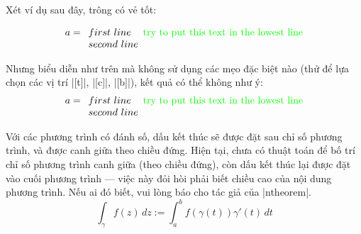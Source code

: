 {\begin{Theorem}
{\begin{Lemma}
\medskip
Xét ví dụ sau đây, trông có vẻ tốt:
\begin{command}
 \[\begin{array}{l}
      a = \begin{array}[t]{l}
            first\ line \\
            second\ line
         \end{array}%
     \mbox{\color{green}{try to put this text in the lowest line}}
   \end{array}
  \]
\end{command}
Nhưng biểu diễn như trên mà không sử dụng các mẹo đặc biệt nào
(thử để lựa chọn các vị trí |[t]|, |[c]|, |[b]|),
kết quả có thể không như ý:
\[\begin{array}{l}
   a = \begin{array}[t]{l}
         first\ line \\
         second\ line
       \end{array}%
   \mbox{\color{green}{try to put this text in the lowest line}}
  \end{array}\]
\end{Lemma}}
{\color{green!75!red}
\begin{Lemma}[Phương trình]
Với các phương trình có đánh số, dấu kết thúc sẽ được đặt sau chỉ số
phương trình, và được canh giữa theo chiều đứng. Hiện tại, chưa có thuật
toán để bố trí chỉ số phương trình canh giữa (theo chiều đứng),
còn dấu kết thúc lại được đặt vào cuối phương trình --- việc này đỏi hòi
phải biết chiều cao của nội dung phương trình. Nếu ai đó biết,
vui lòng báo cho tác giả của |ntheorem|.
\begin{equation}
 \int_{\gamma} f(z)\, dz := \int_a^b f(\gamma (t)) \gamma'(t) \, dt
\end{equation}
\end{Lemma}}


\end{Theorem}}

